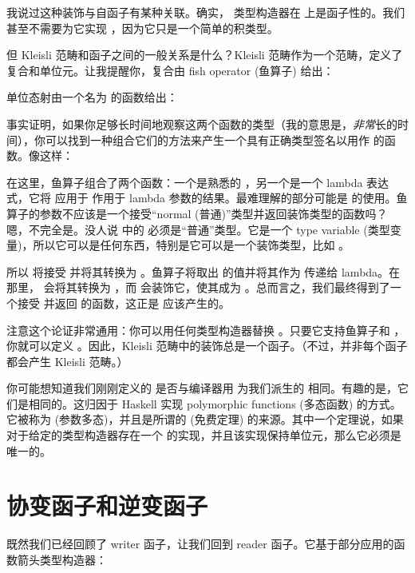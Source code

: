 我说过这种装饰与自函子有某种关联。确实， 类型构造器在  上是函子性的。我们甚至不需要为它实现 ，因为它只是一个简单的积类型。

但 Kleisli 范畴和函子之间的一般关系是什么？Kleisli 范畴作为一个范畴，定义了复合和单位元。让我提醒你，复合由 fish operator (鱼算子) 给出：

单位态射由一个名为  的函数给出：

事实证明，如果你足够长时间地观察这两个函数的类型（我的意思是，\emph{非常}长的时间），你可以找到一种组合它们的方法来产生一个具有正确类型签名以用作  的函数。像这样：

在这里，鱼算子组合了两个函数：一个是熟悉的 ，另一个是一个 lambda 表达式，它将  应用于  作用于 lambda 参数的结果。最难理解的部分可能是  的使用。鱼算子的参数不应该是一个接受“normal (普通)”类型并返回装饰类型的函数吗？嗯，不完全是。没人说  中的  必须是“普通”类型。它是一个 type variable (类型变量)，所以它可以是任何东西，特别是它可以是一个装饰类型，比如 。

所以  将接受  并将其转换为 。鱼算子将取出  的值并将其作为  传递给 lambda。在那里， 会将其转换为 ，而  会装饰它，使其成为 。总而言之，我们最终得到了一个接受  并返回  的函数，这正是  应该产生的。

注意这个论证非常通用：你可以用任何类型构造器替换 。只要它支持鱼算子和 ，你就可以定义 。因此，Kleisli 范畴中的装饰总是一个函子。（不过，并非每个函子都会产生 Kleisli 范畴。）

你可能想知道我们刚刚定义的  是否与编译器用  为我们派生的  相同。有趣的是，它们是相同的。这归因于 Haskell 实现 polymorphic functions (多态函数) 的方式。它被称为  (参数多态)，并且是所谓的  (免费定理) 的来源。其中一个定理说，如果对于给定的类型构造器存在一个  的实现，并且该实现保持单位元，那么它必须是唯一的。

\section{协变函子和逆变函子}

既然我们已经回顾了 writer 函子，让我们回到 reader 函子。它基于部分应用的函数箭头类型构造器：

